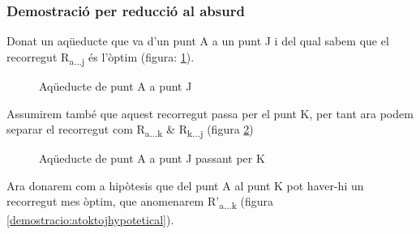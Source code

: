 \documentclass[12pt, letterpaper]{article}
\begin{document}
\newpage
\subsubsection{Demostració per reducció al absurd}
Donat un aqüeducte que va d'un punt A a un punt J i del qual sabem que el recorregut R\textsubscript{a...j} és l'òptim (figura: \ref{demostracio:atoj}).

\begin{figure}[htbp]
\begin{center}
\caption{Aqüeducte de punt A a punt J}
\label{demostracio:atoj}
\end{center}
\end{figure}

Assumirem també que aquest recorregut passa per el punt K, per tant ara podem separar el recorregut com R\textsubscript{a...k} \& R\textsubscript{k...j} (figura \ref{demostracio:atoktoj})

\begin{figure}[htbp]
\begin{center}
\caption{Aqüeducte de punt A a punt J passant per K}
\label{demostracio:atoktoj}
\end{center}
\end{figure}

Ara donarem com a hipòtesis que del punt A al punt K pot haver-hi un recorregut mes òptim, que anomenarem R'\textsubscript{a...k} (figura \ref{demostracio:atoktojhypotetical}).
\end{document}
